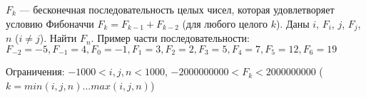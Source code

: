 $F_k$ --- бесконечная последовательность целых чисел, которая
удовлетворяет условию Фибоначчи $F_k = F_{k-1}+F_{k-2}$
(для любого целого $k$). Даны $i$, $F_i$, $j$,
$F_j$, $n$ ($i \ne j$). Найти
$F_n$. Пример части последовательности:
$F_{-2}=-5, F_{-1}=4, F_{0}=-1, F_{1}=3, F_{2}=2, F_{3}=5, F_{4}=7, F_{5}=12, F_{6}=19$

Ограничения: $-1000 < i, j, n < 1000$, 
$-2000000000 < F_k < 2000000000$
($k = min(i, j, n)\ldots max(i,j,n)$)